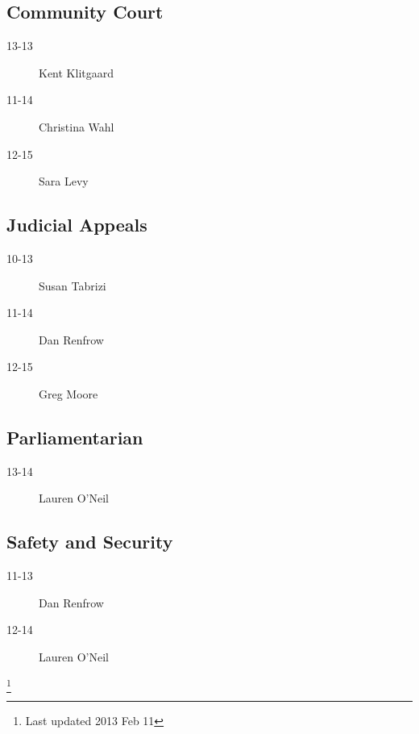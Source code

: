 \documentclass[10pt, twocolumn]{amsart}
\begin{document}
\subsection*{Community Court}
\begin{description}
\item[13-13] Kent Klitgaard
\item[11-14] Christina Wahl
\item[12-15] Sara Levy
\end{description}

\subsection*{Judicial Appeals}
\begin{description}
\item[10-13] Susan Tabrizi
\item[11-14] Dan Renfrow
\item[12-15] Greg Moore
\end{description}

\subsection*{Parliamentarian}
\begin{description}
\item[13-14] Lauren O'Neil
\end{description}

\subsection*{Safety and Security}
\begin{description}
\item[11-13] Dan Renfrow
\item[12-14] Lauren O'Neil
\end{description}
\vfill
\footnote{Last updated 2013 Feb 11}
\end{document}
